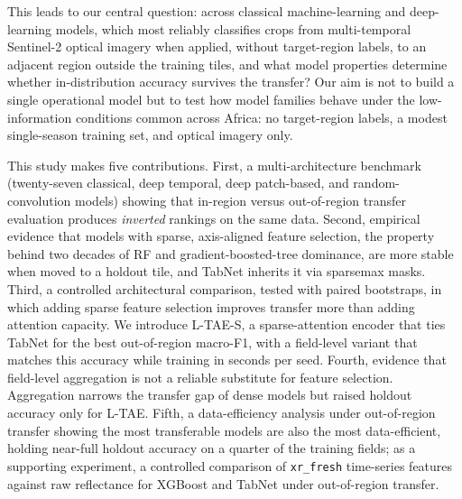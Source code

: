 \documentclass[preprint,authoryear]{elsarticle}
\begin{document}
This leads to our central question: across classical machine-learning and deep-learning models, which most reliably classifies crops from multi-temporal Sentinel-2 optical imagery when applied, without target-region labels, to an adjacent region outside the training tiles, and what model properties determine whether in-distribution accuracy survives the transfer? Our aim is not to build a single operational model but to test how model families behave under the low-information conditions common across Africa: no target-region labels, a modest single-season training set, and optical imagery only.

This study makes five contributions. First, a multi-architecture benchmark (twenty-seven classical, deep temporal, deep patch-based, and random-convolution models) showing that in-region versus out-of-region transfer evaluation produces \emph{inverted} rankings on the same data. Second, empirical evidence that models with sparse, axis-aligned feature selection, the property behind two decades of RF and gradient-boosted-tree dominance, are more stable when moved to a holdout tile, and TabNet inherits it via sparsemax masks. Third, a controlled architectural comparison, tested with paired bootstraps, in which adding sparse feature selection improves transfer more than adding attention capacity. We introduce L-TAE-S, a sparse-attention encoder that ties TabNet for the best out-of-region macro-F1, with a field-level variant that matches this accuracy while training in seconds per seed. Fourth, evidence that field-level aggregation is not a reliable substitute for feature selection. Aggregation narrows the transfer gap of dense models but raised holdout accuracy only for L-TAE. Fifth, a data-efficiency analysis under out-of-region transfer showing the most transferable models are also the most data-efficient, holding near-full holdout accuracy on a quarter of the training fields; as a supporting experiment, a controlled comparison of \texttt{xr\_fresh} time-series features against raw reflectance for XGBoost and TabNet under out-of-region transfer.
\end{document}
